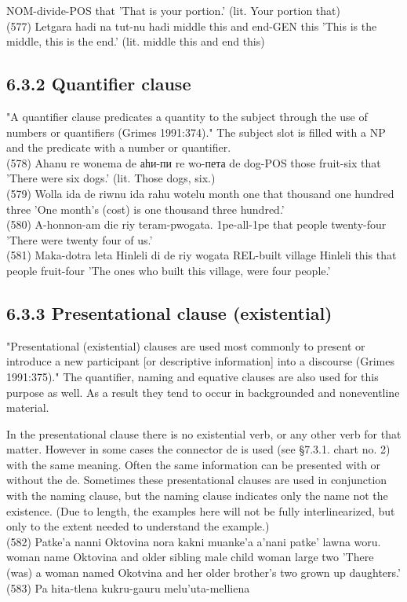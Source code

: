 \documentclass[10pt]{article}
\begin{document}
NOM-divide-POS that 'That is your portion.' (lit. Your portion that)\\
(577) Letgara hadi na tut-nu hadi middle this and end-GEN this 'This is the middle, this is the end.' (lit. middle this and end this)

\subsection*{6.3.2 Quantifier clause}
"A quantifier clause predicates a quantity to the subject through the use of numbers or quantifiers (Grimes 1991:374)." The subject slot is filled with a NP and the predicate with a number or quantifier.\\
(578) Ahanu re wonema de аһи-пи re wo-пета de dog-POS those fruit-six that 'There were six dogs.' (lit. Those dogs, six.)\\
(579) Wolla ida de riwnu ida rahu wotelu month one that thousand one hundred three 'One month's (cost) is one thousand three hundred.'\\
(580) A-honnon-am die riy teram-pwogata. 1pe-all-1pe that people twenty-four 'There were twenty four of us.'\\
(581) Maka-dotra leta Hinleli di de riy wogata REL-built village Hinleli this that people fruit-four 'The ones who built this village, were four people.'

\subsection*{6.3.3 Presentational clause (existential)}
"Presentational (existential) clauses are used most commonly to present or introduce a new participant [or descriptive information] into a discourse (Grimes 1991:375)." The quantifier, naming and equative clauses are also used for this purpose as well. As a result they tend to occur in backgrounded and noneventline material.

In the presentational clause there is no existential verb, or any other verb for that matter. However in some cases the connector de is used (see §7.3.1. chart no. 2) with the same meaning. Often the same information can be presented with or without the de. Sometimes these presentational clauses are used in conjunction with the naming clause, but the naming clause indicates only the name not the existence. (Due to length, the examples here will not be fully interlinearized, but only to the extent needed to understand the example.)\\
(582) Patke'a nanni Oktovina nora kakni muanke'a a'nani patke' lawna woru. woman name Oktovina and older sibling male child woman large two 'There (was) a woman named Okotvina and her older brother's two grown up daughters.'\\
(583) Pa hita-tlena kukru-gauru melu'uta-melliena
\end{document}
